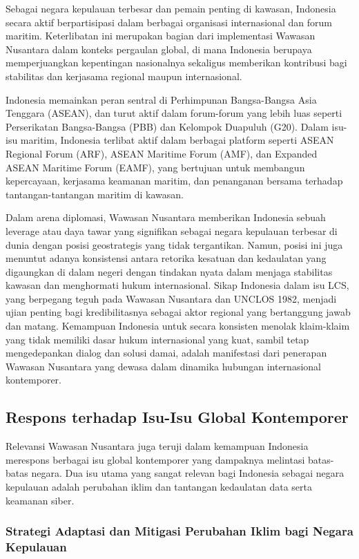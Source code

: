 \documentclass[12pt, a4paper]{article}
\begin{document}
Sebagai negara kepulauan terbesar dan pemain penting di kawasan, Indonesia secara aktif berpartisipasi dalam berbagai organisasi internasional dan forum maritim. Keterlibatan ini merupakan bagian dari implementasi Wawasan Nusantara dalam konteks pergaulan global, di mana Indonesia berupaya memperjuangkan kepentingan nasionalnya sekaligus memberikan kontribusi bagi stabilitas dan kerjasama regional maupun internasional.  

Indonesia memainkan peran sentral di Perhimpunan Bangsa-Bangsa Asia Tenggara (ASEAN), dan turut aktif dalam forum-forum yang lebih luas seperti Perserikatan Bangsa-Bangsa (PBB) dan Kelompok Duapuluh (G20). Dalam isu-isu maritim, Indonesia terlibat aktif dalam berbagai platform seperti ASEAN Regional Forum (ARF), ASEAN Maritime Forum (AMF), dan Expanded ASEAN Maritime Forum (EAMF), yang bertujuan untuk membangun kepercayaan, kerjasama keamanan maritim, dan penanganan bersama terhadap tantangan-tantangan maritim di kawasan.  

Dalam arena diplomasi, Wawasan Nusantara memberikan Indonesia sebuah leverage atau daya tawar yang signifikan sebagai negara kepulauan terbesar di dunia dengan posisi geostrategis yang tidak tergantikan. Namun, posisi ini juga menuntut adanya konsistensi antara retorika kesatuan dan kedaulatan yang digaungkan di dalam negeri dengan tindakan nyata dalam menjaga stabilitas kawasan dan menghormati hukum internasional. Sikap Indonesia dalam isu LCS, yang berpegang teguh pada Wawasan Nusantara dan UNCLOS 1982, menjadi ujian penting bagi kredibilitasnya sebagai aktor regional yang bertanggung jawab dan matang. Kemampuan Indonesia untuk secara konsisten menolak klaim-klaim yang tidak memiliki dasar hukum internasional yang kuat, sambil tetap mengedepankan dialog dan solusi damai, adalah manifestasi dari penerapan Wawasan Nusantara yang dewasa dalam dinamika hubungan internasional kontemporer.
\subsection*{Respons terhadap Isu-Isu Global Kontemporer}

Relevansi Wawasan Nusantara juga teruji dalam kemampuan Indonesia merespons berbagai isu global kontemporer yang dampaknya melintasi batas-batas negara. Dua isu utama yang sangat relevan bagi Indonesia sebagai negara kepulauan adalah perubahan iklim dan tantangan kedaulatan data serta keamanan siber.
\subsubsection*{Strategi Adaptasi dan Mitigasi Perubahan Iklim bagi Negara Kepulauan}
\end{document}
